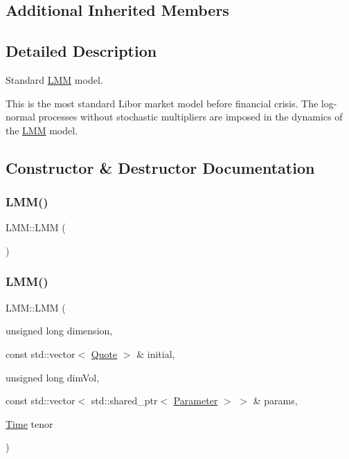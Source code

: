 \subsection*{Additional Inherited Members}


\subsection{Detailed Description}
Standard \hyperlink{class_l_m_m}{L\+MM} model. 

This is the most standard Libor market model before financial crisis. The log-\/normal processes without stochastic multipliers are imposed in the dynamics of the \hyperlink{class_l_m_m}{L\+MM} model. 

\subsection{Constructor \& Destructor Documentation}
\hypertarget{class_l_m_m_a4de26d3647b221d5d16667a402edfef2}{}\label{class_l_m_m_a4de26d3647b221d5d16667a402edfef2} 
\subsubsection{\texorpdfstring{L\+M\+M()}{LMM()}\hspace{0.1cm}{\footnotesize\ttfamily [1/2]}}
{\footnotesize\ttfamily L\+M\+M\+::\+L\+MM (\begin{DoxyParamCaption}{ }\end{DoxyParamCaption})\hspace{0.3cm}{\ttfamily [default]}}

\hypertarget{class_l_m_m_aa6d3ff98a4153869dd59c17135181a4c}{}\label{class_l_m_m_aa6d3ff98a4153869dd59c17135181a4c} 
\subsubsection{\texorpdfstring{L\+M\+M()}{LMM()}\hspace{0.1cm}{\footnotesize\ttfamily [2/2]}}
{\footnotesize\ttfamily L\+M\+M\+::\+L\+MM (\begin{DoxyParamCaption}\item[{unsigned long}]{dimension,  }\item[{const std\+::vector$<$ \hyperlink{_name_def_8h_a642a6c5fd87319d922637de0e0bb0305}{Quote} $>$ \&}]{initial,  }\item[{unsigned long}]{dim\+Vol,  }\item[{const std\+::vector$<$ std\+::shared\+\_\+ptr$<$ \hyperlink{class_parameter}{Parameter} $>$ $>$ \&}]{params,  }\item[{\hyperlink{_name_def_8h_ac2d3e0ba793497bcca555c7c2cf64ff3}{Time}}]{tenor }\end{DoxyParamCaption})}


